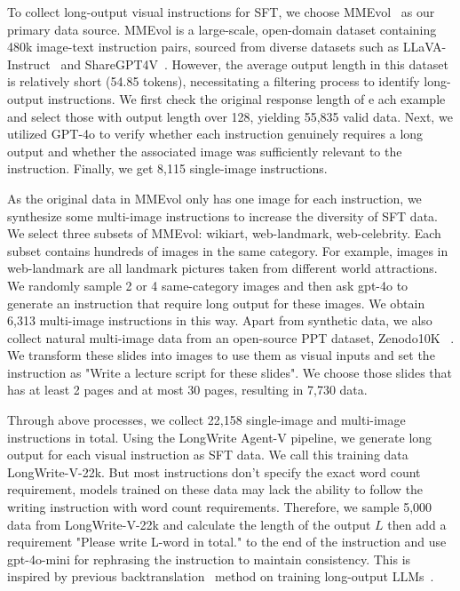 To collect long-output visual instructions for SFT, we choose MMEvol~\cite{luo2024mmevol} as our primary data source. MMEvol is a large-scale, open-domain dataset containing 480k image-text instruction pairs, sourced from diverse datasets such as LLaVA-Instruct~\cite{liu2024visual} and ShareGPT4V~\cite{chen2024sharegpt4v}. However, the average output length in this dataset is relatively short (54.85 tokens), necessitating a filtering process to identify long-output instructions. We first check the original response length of e ach example and select those with output length over 128, yielding 55,835 valid data. Next, we utilized GPT-4o to verify whether each instruction genuinely requires a long output and whether the associated image was sufficiently relevant to the instruction. Finally, we get 8,115 single-image instructions.




 As the original data in MMEvol only has one image for each instruction, we synthesize some multi-image instructions to increase the diversity of SFT data.  We select three subsets of MMEvol: wikiart, web-landmark, web-celebrity. Each subset contains hundreds of images in the same category. For example, images in web-landmark are all landmark pictures taken from different world attractions. We randomly sample 2 or 4 same-category images and then ask gpt-4o to generate an instruction that require long output for these images. We obtain 6,313 multi-image instructions in this way. Apart from synthetic data, we also collect natural multi-image data from an open-source PPT dataset, Zenodo10K ~\cite{zheng2025pptagent}. We transform these slides into images to use them as visual inputs and set the instruction as "Write a lecture script for these slides". We choose those slides that has at least 2 pages and at most 30 pages, resulting in 7,730 data.







Through above processes, we collect 22,158 single-image and multi-image instructions in total. Using the LongWrite Agent-V pipeline, we generate long output for each visual instruction as SFT data. We call this training data LongWrite-V-22k.  But most instructions don't specify the exact word count requirement, models trained on these data may lack the ability to follow the writing instruction with word count requirements. Therefore, we sample 5,000 data from LongWrite-V-22k and calculate the length of the output $L$ then add a requirement "Please write L-word in total." to the end of the instruction and use gpt-4o-mini for rephrasing the instruction to maintain consistency. This is inspired by previous backtranslation~\cite{li2023self} method on training long-output LLMs~\cite{pham2024suri}.

